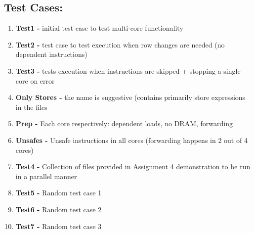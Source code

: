 \documentclass{article}
\begin{document}
\subsection*{Test Cases:}
\begin{enumerate}
    \item \textbf{Test1 -} initial test case to test multi-core functionality
    \item \textbf{Test2 -} test case to test execution when row changes are needed (no dependent instructions)
%
    \item \textbf{Test3 -} tests execution when instructions are skipped + stopping a single core on error
    \item \textbf{Only Stores -} the name is suggestive (contains primarily store expressions in the files %
%
    \item \textbf{Prep -} Each core respectively: dependent loads, no DRAM, forwarding
%
    \item \textbf{Unsafes -} Unsafe instructions in all cores (forwarding happens in 2 out of 4 cores)
%
    \item \textbf{Test4 -} Collection of files provided in Assignment 4 demonstration to be run in a parallel manner
%
    \item \textbf{Test5 -} Random test case 1
%
    \item \textbf{Test6 -} Random test case 2
%
    \item \textbf{Test7 -} Random test case 3
\end{enumerate}
\end{document}
